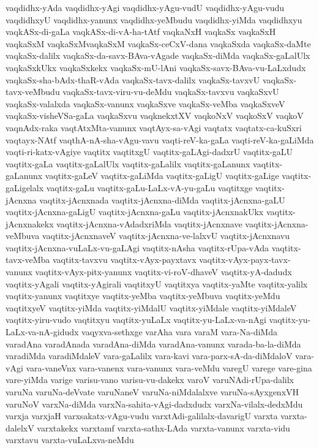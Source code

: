 {vaqdidhx-yAda
vaqdidhx-yAgi
vaqdidhx-yAgu-vudU
vaqdidhx-yAgu-vudu
vaqdidhxyU
vaqdidhx-yanunx
vaqdidhx-yeMbudu
vaqdidhx-yiMda
vaqdidhxyu
vaqkASx-di-gaLa
vaqkASx-di-vA-ha-tAtf
vaqkaNxH
vaqkaSx
vaqkaSxH
vaqkaSxM
vaqkaSxMvaqkaSxM
vaqkaSx-ceCxV-dana
vaqkaSxda
vaqkaSx-daMte
vaqkaSx-dalilx
vaqkaSx-da-savx-BAva-vAgade
vaqkaSx-diMda
vaqkaSx-gaLalUlx
vaqkaSxkUkx
vaqkaSxkekx
vaqkaSx-mU-lAni
vaqkaSx-savx-BAva-vu-LaLxdudx
vaqkaSx-sha-bAdx-thaR-vAda
vaqkaSx-tavx-dalilx
vaqkaSx-tavxvU
vaqkaSx-tavx-veMbudu
vaqkaSx-tavx-viru-vu-deMdu
vaqkaSx-tavxvu
vaqkaSxvU
vaqkaSx-valalxda
vaqkaSx-vanunx
vaqkaSxve
vaqkaSx-veMba
vaqkaSxveV
vaqkaSx-visheVSa-gaLa
vaqkaSxvu
vaqknekxtXV
vaqkoNxV
vaqkoSxV
vaqkoV
vaqnAdx-raka
vaqtAtxMta-vanunx
vaqtAyx-sa-vAgi
vaqtatx
vaqtatx-ca-kuSxri
vaqtayx-NAtf
vaqthA-nA-sha-vAgu-vavu
vaqti-reV-ka-gaLa
vaqti-reV-ka-gaLiMda
vaqti-ri-katx-vAgiye
vaqtitx
vaqtitxgU
vaqtitx-gaLAgi-dadxrU
vaqtitx-gaLU
vaqtitx-gaLa
vaqtitx-gaLalUlx
vaqtitx-gaLalilx
vaqtitx-gaLanunx
vaqtitx-gaLanunx
vaqtitx-gaLeV
vaqtitx-gaLiMda
vaqtitx-gaLigU
vaqtitx-gaLige
vaqtitx-gaLigelalx
vaqtitx-gaLu
vaqtitx-gaLu-LaLx-vA-yu-gaLu
vaqtitxge
vaqtitx-jAcnxna
vaqtitx-jAcnxnada
vaqtitx-jAcnxna-diMda
vaqtitx-jAcnxna-gaLU
vaqtitx-jAcnxna-gaLigU
vaqtitx-jAcnxna-gaLu
vaqtitx-jAcnxnakUkx
vaqtitx-jAcnxnakekx
vaqtitx-jAcnxna-vAdadxriMda
vaqtitx-jAcnxnave
vaqtitx-jAcnxna-veMbuva
vaqtitx-jAcnxnaveV
vaqtitx-jAcnxna-ve-lalxvU
vaqtitx-jAcnxnavu
vaqtitx-jAcnxna-vuLaLx-vu-gaLAgi
vaqtitx-nAsha
vaqtitx-rUpa-vAda
vaqtitx-tavx-veMba
vaqtitx-tavxvu
vaqtitx-vAyx-payxtavx
vaqtitx-vAyx-payx-tavx-vanunx
vaqtitx-vAyx-pitx-yanunx
vaqtitx-vi-roV-dhaveV
vaqtitx-yA-dadudx
vaqtitx-yAgali
vaqtitx-yAgirali
vaqtitxyU
vaqtitxya
vaqtitx-yaMte
vaqtitx-yalilx
vaqtitx-yanunx
vaqtitxye
vaqtitx-yeMba
vaqtitx-yeMbuva
vaqtitx-yeMdu
vaqtitxyeV
vaqtitx-yiMda
vaqtitx-yiMdalU
vaqtitx-yiMdale
vaqtitx-yiMdaleV
vaqtitx-yiru-vudo
vaqtitxyu
vaqtitx-yuLaLx
vaqtitx-yu-LaLx-va-nAgi
vaqtitx-yu-LaLx-va-nA-gidudx
vaqyxva-sethxge
varAha
vara
varaM
vara-Na-diMda
varadAna
varadAnada
varadAna-diMda
varadAna-vanunx
varada-ba-la-diMda
varadiMda
varadiMdaleV
vara-gaLalilx
vara-kavi
vara-parx-sA-da-diMdaloV
vara-vAgi
vara-vaneVnx
vara-vanenx
vara-vanunx
vara-veMdu
varegU
varege
vare-gina
vare-yiMda
varige
varisu-vano
varisu-vu-dakekx
varoV
varuNAdi-rUpa-dalilx
varuNa
varuNa-deVvate
varuNaneV
varuNa-niMdalalxve
varuNa-sAyxgenxVH
varuNoV
varxNa-diMda
varxNa-sahita-vAgi-dadxdudx
varxNa-vilalx-dedxMdu
varxja
varxjaH
varxsakatx-vAgu-vudu
varxtAdi-galilalx-davarigU
varxta
varxta-dalelxV
varxtakekx
varxtamf
varxta-sathx-LAda
varxta-vanunx
varxta-vidu
varxtavu
varxta-vuLaLxva-neMdu
}
